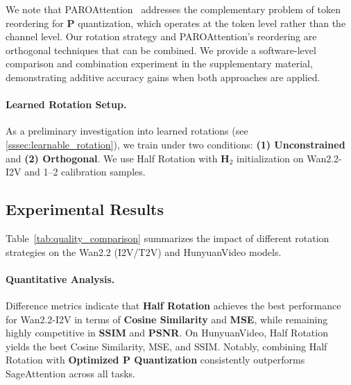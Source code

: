 We note that PAROAttention~\cite{zhao2025paroattention} addresses the complementary problem of token reordering for $\mathbf{P}$ quantization, which operates at the token level rather than the channel level. Our rotation strategy and PAROAttention's reordering are orthogonal techniques that can be combined. We provide a software-level comparison and combination experiment in the supplementary material, demonstrating additive accuracy gains when both approaches are applied.

\paragraph{\textbf{Learned Rotation Setup.}}
As a preliminary investigation into learned rotations (see \cref{sssec:learnable_rotation}), we train under two conditions: \textbf{(1) Unconstrained} and \textbf{(2) Orthogonal}. We use Half Rotation with $\mathbf{H}_2$ initialization on Wan2.2-I2V and 1--2 calibration samples.





\subsection{Experimental Results}




Table~\ref{tab:quality_comparison} summarizes the impact of different rotation strategies on the Wan2.2 (I2V/T2V) and HunyuanVideo models.

\paragraph{\textbf{Quantitative Analysis.}}
Difference metrics indicate that \textbf{Half Rotation} achieves the best performance for Wan2.2-I2V in terms of \textbf{Cosine Similarity} and \textbf{MSE}, while remaining highly competitive in \textbf{SSIM} and \textbf{PSNR}. On HunyuanVideo, Half Rotation yields the best Cosine Similarity, MSE, and SSIM. Notably, combining Half Rotation with \textbf{Optimized $\mathbf{P}$ Quantization} consistently outperforms SageAttention across all tasks.




